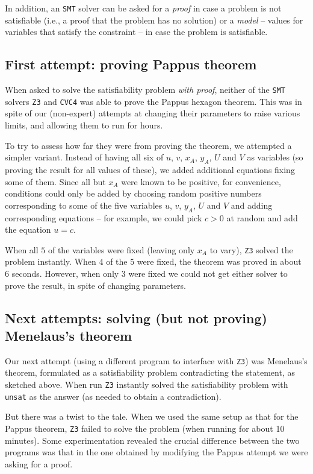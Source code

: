 \documentclass{amsart}
\theoremstyle{plain}
\theoremstyle{definition}
\theoremstyle{remark}
\begin{document}
In addition, an \texttt{SMT} solver can be asked for a
\emph{proof} in case a problem is not satisfiable (i.e., a proof that
the problem has no solution) or a \emph{model} -- values for variables
that satisfy the constraint -- in case the problem is satisfiable.

\subsection{First attempt: proving Pappus theorem}

When asked to solve the satisfiability problem \emph{with proof},
neither of the \texttt{SMT} solvers \texttt{Z3} and \texttt{CVC4} was able to
prove the Pappus hexagon theorem. This was in spite of our (non-expert)
attempts at changing their parameters to raise various limits,
and allowing them to run for hours.

To try to assess how far they were from proving the theorem, we attempted
a simpler variant. Instead of having all six of \(u\), \(v\), \(x_A\),
\(y_A\), \(U\) and \(V\) as variables (so proving the result for all
values of these), we added additional equations fixing some of them.
Since all but \(x_A\) were known to be positive, for convenience,
conditions could only be added by choosing random positive numbers
corresponding to some of the five variables \(u\), \(v\), \(y_A\), \(U\)
and \(V\) and adding corresponding equations -- for example, we could
pick \(c > 0\) at random and add the equation \(u = c\).

When all \(5\) of the variables were fixed (leaving only \(x_A\) to
vary), \texttt{Z3} solved the problem instantly. When \(4\) of the \(5\) were
fixed, the theorem was proved in about 6 seconds. However, when only
\(3\) were fixed we could not get either solver to prove the result, in
spite of changing parameters.

\subsection{Next attempts: solving (but not proving) Menelaus's theorem}

Our next attempt (using a different program to interface with \texttt{Z3}) was Menelaus's theorem,
formulated as a satisfiability problem contradicting the
statement, as sketched above. When run \texttt{Z3} instantly solved the satisfiability problem
with \texttt{unsat} as the answer (as needed to obtain a contradiction).

But there was a twist to the tale. When we used the same setup as that for the Pappus theorem,
\texttt{Z3} failed to solve the problem (when running for about 10
minutes). Some experimentation revealed the crucial difference between
the two programs was that in the one obtained by modifying the Pappus attempt we were asking for a proof.
\end{document}
